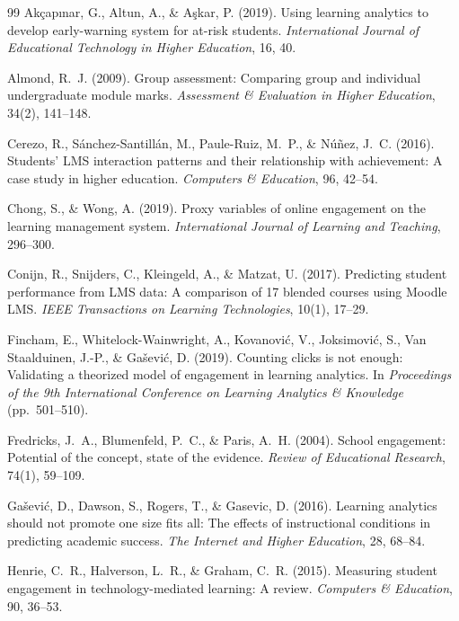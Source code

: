 \documentclass[11pt,a4paper]{article}
\begin{document}
\begin{thebibliography}{99}
Akçapınar, G., Altun, A., \& Aşkar, P. (2019). Using learning analytics to
develop early-warning system for at-risk students. \textit{International Journal
of Educational Technology in Higher Education}, 16, 40.

Almond, R.~J. (2009). Group assessment: Comparing group and individual
undergraduate module marks. \textit{Assessment \& Evaluation in Higher
Education}, 34(2), 141--148.

Cerezo, R., Sánchez-Santillán, M., Paule-Ruiz, M.~P., \& Núñez, J.~C. (2016).
Students' LMS interaction patterns and their relationship with achievement: A
case study in higher education. \textit{Computers \& Education}, 96, 42--54.

Chong, S., \& Wong, A. (2019). Proxy variables of online engagement on the learning
management system. \textit{International Journal of Learning and Teaching}, 296--300.

Conijn, R., Snijders, C., Kleingeld, A., \& Matzat, U. (2017). Predicting student
performance from LMS data: A comparison of 17 blended courses using Moodle LMS.
\textit{IEEE Transactions on Learning Technologies}, 10(1), 17--29.

Fincham, E., Whitelock-Wainwright, A., Kovanović, V., Joksimović, S., Van
Staalduinen, J.-P., \& Gašević, D. (2019). Counting clicks is not enough:
Validating a theorized model of engagement in learning analytics. In
\textit{Proceedings of the 9th International Conference on Learning Analytics
\& Knowledge} (pp.~501--510).

Fredricks, J.~A., Blumenfeld, P.~C., \& Paris, A.~H. (2004). School engagement:
Potential of the concept, state of the evidence. \textit{Review of Educational
Research}, 74(1), 59--109.

Gašević, D., Dawson, S., Rogers, T., \& Gasevic, D. (2016). Learning analytics
should not promote one size fits all: The effects of instructional conditions in
predicting academic success. \textit{The Internet and Higher Education}, 28,
68--84.

Henrie, C.~R., Halverson, L.~R., \& Graham, C.~R. (2015). Measuring student
engagement in technology-mediated learning: A review. \textit{Computers \&
Education}, 90, 36--53.


\end{thebibliography}
\end{document}
